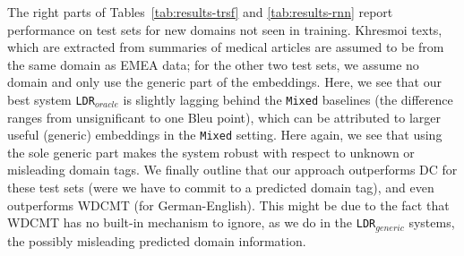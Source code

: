 \documentclass[11pt,a4paper]{article}
\begin{document}
The right parts of Tables~\ref{tab:results-trsf} and \ref{tab:results-rnn} report performance on test sets for new domains not seen in training. Khresmoi texts, which are extracted from summaries of medical articles are assumed to be from the same domain as EMEA data; for the other two test sets, we assume no domain and only use the generic part of the embeddings. Here, we see that our best system \texttt{LDR}$_{oracle}$ is slightly lagging behind the \texttt{Mixed} baselines (the difference ranges from unsignificant to one Bleu point), which can be attributed to larger useful (generic) embeddings in the \texttt{Mixed} setting. Here again, we see that using the sole generic part makes the system robust with respect to unknown or misleading domain tags. We finally outline that our approach outperforms DC for these test sets (were we have to commit to a predicted domain tag), and even outperforms WDCMT (for German-English). This might be due to the fact that WDCMT has no built-in mechanism to ignore, as we do in the \texttt{LDR}$_{generic}$ systems, the possibly misleading predicted domain information.
\end{document}
